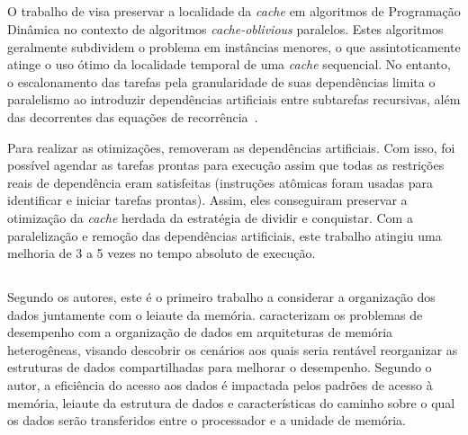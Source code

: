 \subsection{}

O trabalho de  visa preservar a localidade da \textit{cache} em algoritmos de Programação Dinâmica no contexto de algoritmos \textit{cache-oblivious} paralelos.
Estes algoritmos geralmente subdividem o problema em instâncias menores, o que assintoticamente atinge o uso ótimo da localidade temporal de uma \textit{cache} sequencial.
No entanto, o escalonamento das tarefas pela granularidade de suas dependências limita o paralelismo ao introduzir dependências artificiais entre subtarefas recursivas, além das decorrentes das equações de recorrência~\cite{Tang2015}.

Para realizar as otimizações,  removeram as dependências artificiais. Com isso, foi possível agendar as tarefas prontas para execução assim que todas as restrições reais de dependência eram satisfeitas (instruções atômicas foram usadas para identificar e iniciar tarefas prontas). Assim, eles conseguiram preservar a otimização da \textit{cache} herdada da estratégia de dividir e conquistar.
Com a paralelização e remoção das dependências artificiais, este trabalho atingiu uma melhoria de 3 a 5 vezes no tempo absoluto de execução.

\subsection{}


Segundo os autores, este é o primeiro trabalho a considerar a organização dos dados juntamente com o leiaute da memória.
 caracterizam os problemas de desempenho com a organização de dados em arquiteturas de memória heterogêneas, visando descobrir os cenários aos quais seria rentável reorganizar as estruturas de dados compartilhadas para melhorar o desempenho.
Segundo o autor, a eficiência do acesso aos dados é impactada pelos padrões de acesso à memória, leiaute da estrutura de dados e características do caminho sobre o qual os dados serão transferidos entre o processador e a unidade de memória.


